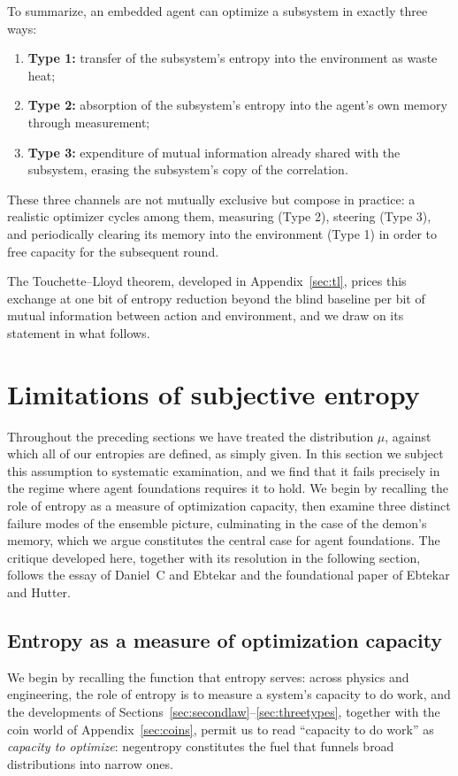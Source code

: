 \documentclass[11pt]{article}
\begin{document}
To summarize, an embedded agent can optimize a subsystem in exactly three ways:
\begin{enumerate}[leftmargin=2em]
  \item \textbf{Type 1:} transfer of the subsystem's entropy into the environment as waste heat;
  \item \textbf{Type 2:} absorption of the subsystem's entropy into the agent's own memory through measurement;
  \item \textbf{Type 3:} expenditure of mutual information already shared with the subsystem, erasing the subsystem's copy of the correlation.
\end{enumerate}
These three channels are not mutually exclusive but compose in practice: a realistic optimizer cycles among them, measuring (Type 2), steering (Type 3), and periodically clearing its memory into the environment (Type 1) in order to free capacity for the subsequent round.

The Touchette--Lloyd theorem, developed in Appendix~\ref{sec:tl}, prices this exchange at one bit of entropy reduction beyond the blind baseline per bit of mutual information between action and environment, and we draw on its statement in what follows.
\section{Limitations of subjective entropy}
\label{sec:subjective}

Throughout the preceding sections we have treated the distribution $\mu$, against which all of our entropies are defined, as simply given. In this section we subject this assumption to systematic examination, and we find that it fails precisely in the regime where agent foundations requires it to hold. We begin by recalling the role of entropy as a measure of optimization capacity, then examine three distinct failure modes of the ensemble picture, culminating in the case of the demon's memory, which we argue constitutes the central case for agent foundations. The critique developed here, together with its resolution in the following section, follows the essay of Daniel~C and Ebtekar and the foundational paper of Ebtekar and Hutter.

\subsection{Entropy as a measure of optimization capacity}
\label{sec:capacity}

We begin by recalling the function that entropy serves: across physics and engineering, the role of entropy is to measure a system's capacity to do work, and the developments of Sections~\ref{sec:secondlaw}--\ref{sec:threetypes}, together with the coin world of Appendix~\ref{sec:coins}, permit us to read ``capacity to do work'' as \emph{capacity to optimize}: negentropy constitutes the fuel that funnels broad distributions into narrow ones.
\end{document}
